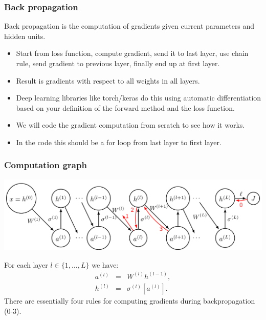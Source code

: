 \documentclass{beamer}
\begin{document}
\begin{frame}[fragile]
  \frametitle{Back propagation}
Back propagation is the computation of gradients given current
parameters and hidden units.
\begin{itemize}
\item Start from loss function, compute gradient, send it to last
  layer, use chain rule, send gradient to previous layer, finally end
  up at first layer.
\item Result is gradients with respect to all weights in all layers.
\item Deep learning libraries like torch/keras do this using automatic
  differentiation based on your definition of the forward method and
  the loss function.
\item We will code the gradient computation from
  scratch to see how it works.
\item In the code this should be a for loop from last layer to first
  layer.
\end{itemize}


\end{frame}

\begin{frame}
  \frametitle{Computation graph}
  \includegraphics[width=\textwidth]{screenshot-backprop-figure}

For
each layer $l\in \{1, \dots, L\}$ we have:
\begin{eqnarray*}
  a^{(l)} &=&  W^{(l)} h^{(l-1)}, \\
  h^{(l)} &=& \sigma^{(l)}\left[ a^{(l)} \right].
\end{eqnarray*}
There are essentially four rules for computing gradients during
backpropagation (0-3).
  
\end{frame}
\end{document}
